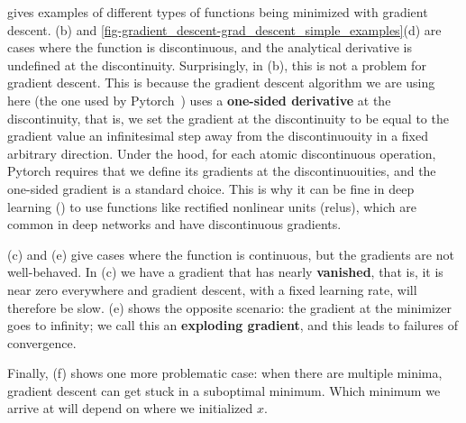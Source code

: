 \Fig{\ref{fig-gradient_descent-grad_descent_simple_examples}} gives examples of different types of functions being minimized with gradient descent. \Figs{\ref{fig-gradient_descent-grad_descent_simple_examples}}(b) and \ref{fig-gradient_descent-grad_descent_simple_examples}(d) are cases where the function is discontinuous, and the analytical derivative is undefined at the discontinuity. Surprisingly, in \fig{\ref{fig-gradient_descent-grad_descent_simple_examples}}(b), this is not a problem for gradient descent. This is because the gradient descent algorithm we are using here (the one used by Pytorch~\cite{paszke2019pytorch}) uses a \textbf{one-sided derivative} at the discontinuity, that is, we set the gradient at the discontinuity to be equal to the gradient value an infinitesimal step away from the discontinuouity in a fixed arbitrary direction. Under the hood, for each atomic discontinuous operation, Pytorch requires that we define its gradients at the discontinuouities, and the one-sided gradient is a standard choice. This is why it can be fine in deep learning (\chap{\ref{chapter-neural_nets}}) to use functions like rectified nonlinear units (relus), which are common in deep networks and have discontinuous gradients.

\Figs{\ref{fig-gradient_descent-grad_descent_simple_examples}}(c) and (e) give cases where the function is continuous, but the gradients are not well-behaved. In \fig{\ref{fig-gradient_descent-grad_descent_simple_examples}}(c) we have a gradient that has nearly \textbf{vanished}, that is, it is near zero everywhere and gradient descent, with a fixed learning rate, will therefore be slow. \Fig{\ref{fig-gradient_descent-grad_descent_simple_examples}}(e) shows the opposite scenario: the gradient at the minimizer goes to infinity; we call this an \textbf{exploding gradient}, and this leads to failures of convergence. 

Finally, \fig{\ref{fig-gradient_descent-grad_descent_simple_examples}}(f) shows one more problematic case: when there are multiple minima, gradient descent can get stuck in a suboptimal minimum. Which minimum we arrive at will depend on where we initialized $x$.  

